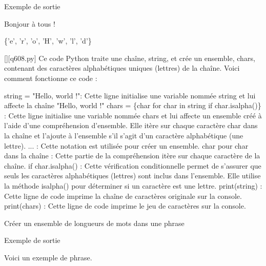 Exemple de sortie

Bonjour à tous !

\{'e', 'r', 'o', 'H', 'w', 'l', 'd'\}
        \par
        \begin{solution}
            \renewcommand{\nomfichier}{q608.py}
            \pythonfile{\chemincode \nomfichier}[][\nomfichier]
            Ce code Python traite une chaîne, string, et crée un ensemble, chars, contenant des caractères alphabétiques uniques (lettres) de la chaîne. Voici comment fonctionne ce code :

    string = "Hello, world !": Cette ligne initialise une variable nommée string et lui affecte la chaîne "Hello, world !"
    chars = \{char for char in string if char.isalpha()\} : Cette ligne initialise une variable nommée chars et lui affecte un ensemble créé à l'aide d'une compréhension d'ensemble. Elle itère sur chaque caractère char dans la chaîne et l'ajoute à l'ensemble s'il s'agit d'un caractère alphabétique (une lettre).
        {...} : Cette notation est utilisée pour créer un ensemble.
        char pour char dans la chaîne : Cette partie de la compréhension itère sur chaque caractère de la chaîne.
        if char.isalpha() : Cette vérification conditionnelle permet de s'assurer que seuls les caractères alphabétiques (lettres) sont inclus dans l'ensemble. Elle utilise la méthode isalpha() pour déterminer si un caractère est une lettre.
    print(string) : Cette ligne de code imprime la chaîne de caractères originale sur la console.
    print(chars) : Cette ligne de code imprime le jeu de caractères sur la console.
        \end{solution}
        

        \question
        Créer un ensemble de longueurs de mots dans une phrase

Exemple de sortie

Voici un exemple de phrase.

